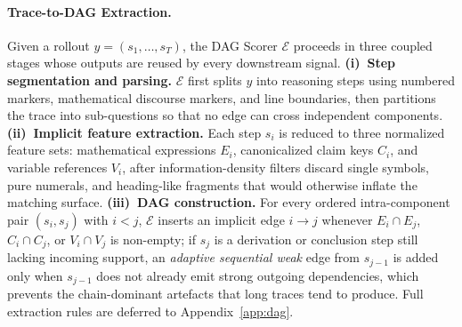 \paragraph{Trace-to-DAG Extraction.}
Given a rollout $y=(s_1,\dots,s_T)$, the DAG Scorer $\mathcal{E}$ proceeds in three coupled stages whose outputs are reused by every downstream signal. \textbf{(i)~Step segmentation and parsing.} $\mathcal{E}$ first splits $y$ into reasoning steps using numbered markers, mathematical discourse markers, and line boundaries, then partitions the trace into sub-questions so that no edge can cross independent components. \textbf{(ii)~Implicit feature extraction.} Each step $s_i$ is reduced to three normalized feature sets: mathematical expressions $E_i$, canonicalized claim keys $C_i$, and variable references $V_i$, after information-density filters discard single symbols, pure numerals, and heading-like fragments that would otherwise inflate the matching surface. \textbf{(iii)~DAG construction.} For every ordered intra-component pair $(s_i,s_j)$ with $i\!<\!j$, $\mathcal{E}$ inserts an implicit edge $i\!\to\!j$ whenever $E_i\!\cap\!E_j$, $C_i\!\cap\!C_j$, or $V_i\!\cap\!V_j$ is non-empty; if $s_j$ is a derivation or conclusion step still lacking incoming support, an \emph{adaptive sequential weak} edge from $s_{j-1}$ is added only when $s_{j-1}$ does not already emit strong outgoing dependencies, which prevents the chain-dominant artefacts that long traces tend to produce. Full extraction rules are deferred to Appendix~\ref{app:dag}.

